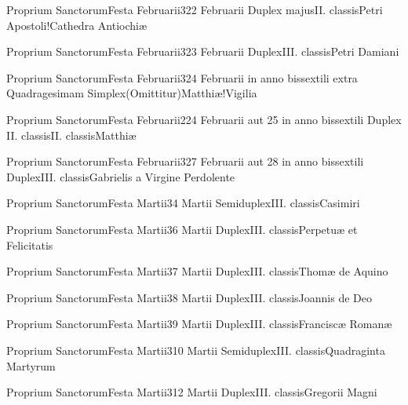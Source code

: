 \documentclass[psalterium-feriale.tex]{subfiles}
\begin{document}
	{Proprium Sanctorum}{Festa Februarii}{3}{22 Februarii}
	{Duplex majus}{II. classis}{Petri Apostoli!Cathedra Antiochiæ}
	{}
	{}
\psalmodiapropria

	{Proprium Sanctorum}{Festa Februarii}{3}{23 Februarii}
	{Duplex}{III. classis}{Petri Damiani}
	{}
	{}
\COPOcRubric

	{Proprium Sanctorum}{Festa Februarii}{3}{24 Februarii in anno bissextili extra Quadragesimam}
	{Simplex}{(Omittitur)}{Matthiæ!Vigilia}
	{}
	{}
\feriaRubric

	{Proprium Sanctorum}{Festa Februarii}{2}{24 Februarii aut 25 in anno bissextili}
	{Duplex II. classis}{II. classis}{Matthiæ}
	{}
	{}
\psalmodiapropria

	{Proprium Sanctorum}{Festa Februarii}{3}{27 Februarii aut 28 in anno bissextili}
	{Duplex}{III. classis}{Gabrielis a Virgine Perdolente\linebreak\null}
	{}
	{}
\COPObRubric

	{Proprium Sanctorum}{Festa Martii}{3}{4 Martii}
	{Semiduplex}{III. classis}{Casimiri}
	{}
	{}
\COPOaRubric

	{Proprium Sanctorum}{Festa Martii}{3}{6 Martii}
	{Duplex}{III. classis}{Perpetuæ et Felicitatis}
	{}
	{}
\MUNMbRubric

	{Proprium Sanctorum}{Festa Martii}{3}{7 Martii}
	{Duplex}{III. classis}{Thomæ de Aquino}
	{}
	{}
\COPOcRubric

	{Proprium Sanctorum}{Festa Martii}{3}{8 Martii}
	{Duplex}{III. classis}{Joannis de Deo}
	{}
	{}
\COPObRubric

	{Proprium Sanctorum}{Festa Martii}{3}{9 Martii}
	{Duplex}{III. classis}{Franciscæ Romanæ}
	{}
	{}
\MUNNaRubric

	{Proprium Sanctorum}{Festa Martii}{3}{10 Martii}
	{Semiduplex}{III. classis}{Quadraginta Martyrum}
	{}
	{}
\PMEXaRubric

	{Proprium Sanctorum}{Festa Martii}{3}{12 Martii}
	{Duplex}{III. classis}{Gregorii Magni}
	{}
	{}
\COPOcRubric
\end{document}
